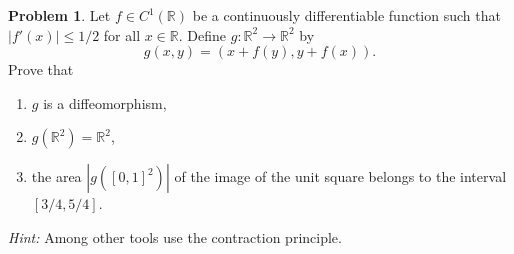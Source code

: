 \documentclass[11pt]{article}
\theoremstyle{definition}
\newtheorem{problem}{Problem}
\theoremstyle{definition}
\begin{document}
\begin{problem}
Let $f\in C^1(\mathbb{R})$ be a continuously differentiable function such that $|f'(x)|\leq 1/2$ for all $x\in\mathbb{R}$. Define
$g:\mathbb{R}^2\to\mathbb{R}^2$ by
$$
g(x,y)=(x+f(y),y+f(x)).
$$
Prove that
\begin{enumerate}[label=(\alph*)]
	\item $g$ is a diffeomorphism,
	
	\item $g(\mathbb{R}^2)=\mathbb{R}^2$,
	
	\item the area $|g([0,1]^2)|$ of the image of the unit square belongs to the interval $[3/4,5/4]$.
\end{enumerate}
{\em Hint:} Among other tools use the contraction principle.
\end{problem}
\end{document}
